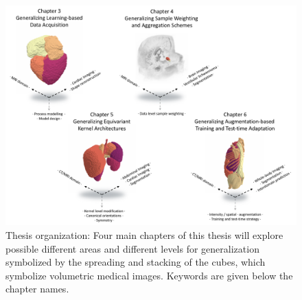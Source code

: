             \begin{figure}
                \includegraphics[width=\textwidth]{sections/01_introduction/figures/draft_areas_levels.pdf}
                \caption{Thesis organization: Four main chapters of this thesis will explore possible different areas and different levels for generalization symbolized by the spreading and stacking of the cubes, which symbolize volumetric medical images. Keywords are given below the chapter names.}
                \label{fig:draft}
            \end{figure}

